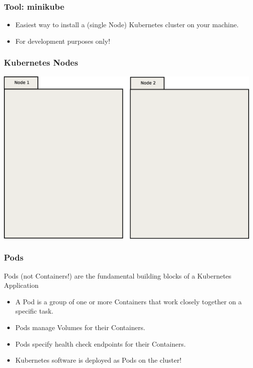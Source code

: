     \begin{frame}
        \frametitle{Tool: minikube\footnotemark}
        \begin{itemize}
            \item Easiest way to install a (single Node) Kubernetes cluster on your machine.
            \item For development purposes only!
        \end{itemize}
    \end{frame}

    \begin{frame}
        \frametitle{Kubernetes Nodes}
        \includegraphics[width=\textwidth,height=0.85\textheight,keepaspectratio]{graphics/00-nodes.eps}
    \end{frame}

    \begin{frame}
        \frametitle{Pods}
        Pods (not Containers!) are the fundamental building blocks of a Kubernetes Application\pause
        \begin{itemize}
            \item A Pod is a group of one or more Containers that work closely together on a specific task.\pause
            \item Pods manage Volumes for their Containers.\pause
            \item Pods specify health check endpoints for their Containers.\pause
            \item Kubernetes software is deployed as Pods on the cluster!
        \end{itemize}
    \end{frame}

